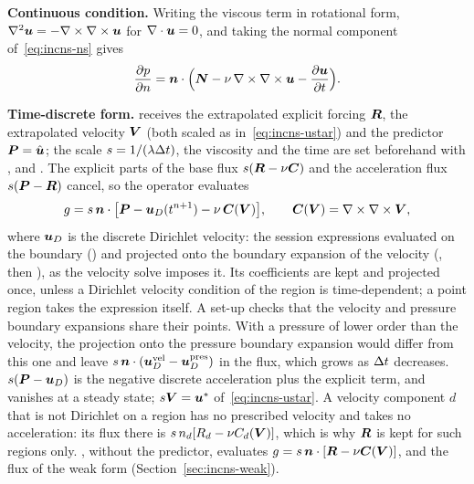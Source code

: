 \textbf{Continuous condition.} Writing the viscous term in rotational
form, $\nabla^2\boldsymbol{u}=-\nabla\times\nabla\times\boldsymbol{u}$ for $\nabla\cdot\boldsymbol{u}=0$, and
taking the normal component of~\eqref{eq:incns-ns} gives
\begin{equation}
  \frac{\partial p}{\partial n}=\boldsymbol{n}\cdot\Bigl(\boldsymbol{N}
  - \nu\,\nabla\times\nabla\times\boldsymbol{u} - \frac{\partial\boldsymbol{u}}{\partial t}\Bigr).
  \label{eq:incns-hopbc}
\end{equation}

\textbf{Time-discrete form.}
 receives the extrapolated
explicit forcing $\boldsymbol{R}$, the extrapolated velocity $\boldsymbol{V}$ (both
scaled as in~\eqref{eq:incns-ustar}) and the predictor
$\boldsymbol{P}=\hat{\boldsymbol{u}}$; the scale $s=1/(\lambda\Delta t)$, the
viscosity and the time are set beforehand with ,
 and . The explicit parts of the base flux
$s(\boldsymbol{R}-\nu\boldsymbol{C})$ and the acceleration flux
$s(\boldsymbol{P}-\boldsymbol{R})$ cancel, so the operator evaluates
\begin{equation}
  g = s\,\boldsymbol{n}\cdot\bigl[\boldsymbol{P}-\boldsymbol{u}_D(t^{n+1})
      -\nu\,\boldsymbol{C}(\boldsymbol{V})\bigr],\qquad
  \boldsymbol{C}(\boldsymbol{V})=\nabla\times\nabla\times\boldsymbol{V},
  \label{eq:incns-hopbc-discrete}
\end{equation}
where $\boldsymbol{u}_D$ is the discrete Dirichlet velocity: the session
expressions evaluated on the boundary () and projected
onto the boundary expansion of the velocity (, then
), as the velocity solve imposes it. Its coefficients are
kept and projected once, unless a Dirichlet velocity condition of the region
is time-dependent; a point region takes the expression itself. A set-up  checks
that the velocity and pressure boundary expansions share their points. With a
pressure of lower order than the velocity, the projection onto the pressure
boundary expansion would differ from this one and leave
$s\,\boldsymbol{n}\cdot(\boldsymbol{u}_D^{\mathrm{vel}}-\boldsymbol{u}_D^{\mathrm{pres}})$
in the flux, which grows as $\Delta t$ decreases.
$s(\boldsymbol{P}-\boldsymbol{u}_D)$ is the negative discrete acceleration plus the
explicit term, and vanishes at a steady state; $s\boldsymbol{V}=\boldsymbol{u}^*$
of~\eqref{eq:incns-ustar}. A velocity component $d$ that is not Dirichlet on
a region has no prescribed velocity and takes no acceleration: its flux
there is $s\,n_d[R_d-\nu C_d(\boldsymbol{V})]$, which is why $\boldsymbol{R}$ is kept
for such regions only. , without the predictor, evaluates
$g=s\,\boldsymbol{n}\cdot[\boldsymbol{R}-\nu\boldsymbol{C}(\boldsymbol{V})]$, and
 the flux of the weak form
(Section~\ref{sec:incns-weak}).

